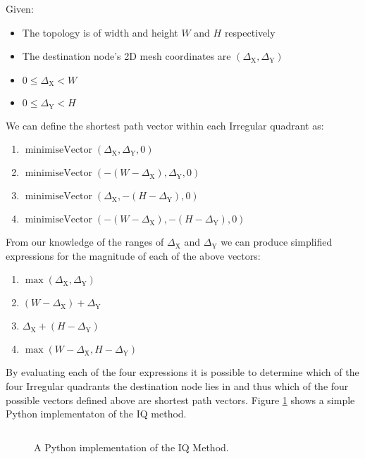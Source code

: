 			Given:
			\begin{itemize}
				\item The topology is of width and height $W$ and $H$ respectively
				\item The destination node's 2D mesh coordinates are
				      $(\Delta_\textrm{X}, \Delta_\textrm{Y})$ 
				\item $0 \le \Delta_\textrm{X} < W$
				\item $0 \le \Delta_\textrm{Y} < H$
			\end{itemize}
			We can define the shortest path vector within each Irregular quadrant as:
			\begin{enumerate}
				\item $\operatorname{minimiseVector}(\Delta_\textrm{X},\Delta_\textrm{Y},0)$
				\item $\operatorname{minimiseVector}(-(W-\Delta_\textrm{X}),\Delta_\textrm{Y},0)$
				\item $\operatorname{minimiseVector}(\Delta_\textrm{X},-(H-\Delta_\textrm{Y}),0)$
				\item $\operatorname{minimiseVector}(-(W-\Delta_\textrm{X}),-(H-\Delta_\textrm{Y}),0)$
			\end{enumerate}
			From our knowledge of the ranges of $\Delta_\textrm{X}$ and
			$\Delta_\textrm{Y}$ we can produce simplified expressions for the
			magnitude of each of the above vectors:
			\begin{enumerate}
				\item $\operatorname{max}(\Delta_\textrm{X}, \Delta_\textrm{Y})$
				\item $(W - \Delta_\textrm{X}) + \Delta_\textrm{Y}$
				\item $\Delta_\textrm{X} + (H - \Delta_\textrm{Y})$
				\item $\operatorname{max}(W-\Delta_\textrm{X}, H-\Delta_\textrm{Y})$
			\end{enumerate}
			By evaluating each of the four expressions it is possible to determine
			which of the four Irregular quadrants the destination node lies in and
			thus which of the four possible vectors defined above are shortest path
			vectors. Figure \ref{fig:iqmethod.py} shows a simple Python implementaton
			of the IQ method.
			
			\begin{figure}
				\inputminted{python}{figures/iqmethod.py}
				
				\caption{A Python implementation of the IQ Method.}
				\label{fig:iqmethod.py}
			\end{figure}
			
